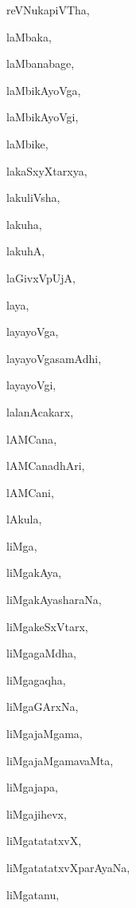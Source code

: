\begin{multicols}{2}
{reVNukapiVTha}, \pageref{reVNukapiVTha}

{laMbaka}, \pageref{laMbaka}

{laMbanabage}, \pageref{laMbanabage}

{laMbikAyoVga}, \pageref{laMbikAyoVga}

{laMbikAyoVgi}, \pageref{laMbikAyoVgi}

{laMbike}, \pageref{laMbike}

{lakaSxyXtarxya}, \pageref{lakaSxyXtarxya}

{lakuliVsha}, \pageref{lakuliVsha}

{lakuha}, \pageref{lakuha}

{lakuhA}, \pageref{lakuhA}

{laGivxVpUjA}, \pageref{laGivxVpUjA}

{laya}, \pageref{laya}

{layayoVga}, \pageref{layayoVga}

{layayoVgasamAdhi}, \pageref{layayoVgasamAdhi}

{layayoVgi}, \pageref{layayoVgi}

{lalanAcakarx}, \pageref{lalanAcakarx}

{lAMCana}, \pageref{lAMCana}

{lAMCanadhAri}, \pageref{lAMCanadhAri}

{lAMCani}, \pageref{lAMCani}

{lAkula}, \pageref{lAkula}

{liMga}, \pageref{liMga}

{liMgakAya}, \pageref{liMgakAya}

{liMgakAyasharaNa}, \pageref{liMgakAyasharaNa}

{liMgakeSxVtarx}, \pageref{liMgakeSxVtarx}

{liMgagaMdha}, \pageref{liMgagaMdha}

{liMgagaqha}, \pageref{liMgagaqha}

{liMgaGArxNa}, \pageref{liMgaGArxNa}

{liMgajaMgama}, \pageref{liMgajaMgama}

{liMgajaMgamavaMta}, \pageref{liMgajaMgamavaMta}

{liMgajapa}, \pageref{liMgajapa}

{liMgajihevx}, \pageref{liMgajihevx}

{liMgatatatxvX}, \pageref{liMgatatatxvX}

{liMgatatatxvXparAyaNa}, \pageref{liMgatatatxvXparAyaNa}

{liMgatanu}, \pageref{liMgatanu}


\end{multicols}
